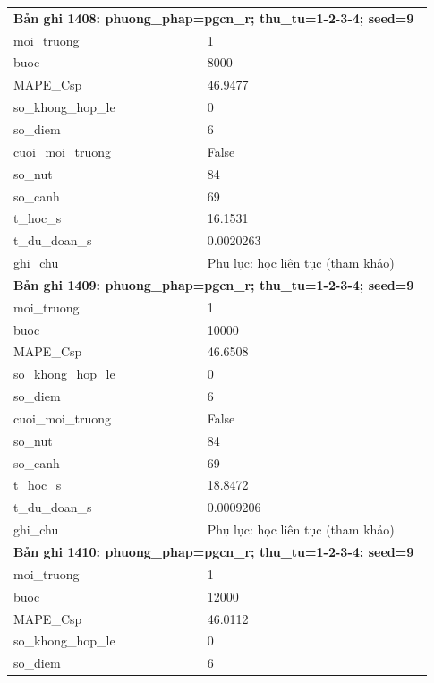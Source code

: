 \begin{longtable}{p{0.43\linewidth}p{0.50\linewidth}}
\midrule
\multicolumn{2}{p{0.95\linewidth}}{\textbf{Bản ghi 1408: phuong\_phap=pgcn\_r; thu\_tu=1-2-3-4; seed=9}} \\
moi\_\allowbreak truong & 1 \\
buoc & 8000 \\
MAPE\_\allowbreak Csp & 46.9477 \\
so\_\allowbreak khong\_\allowbreak hop\_\allowbreak le & 0 \\
so\_\allowbreak diem & 6 \\
cuoi\_\allowbreak moi\_\allowbreak truong & False \\
so\_\allowbreak nut & 84 \\
so\_\allowbreak canh & 69 \\
t\_\allowbreak hoc\_\allowbreak s & 16.1531 \\
t\_\allowbreak du\_\allowbreak doan\_\allowbreak s & 0.0020263 \\
ghi\_\allowbreak chu & Phụ lục: học liên tục (tham khảo) \\
\midrule
\multicolumn{2}{p{0.95\linewidth}}{\textbf{Bản ghi 1409: phuong\_phap=pgcn\_r; thu\_tu=1-2-3-4; seed=9}} \\
moi\_\allowbreak truong & 1 \\
buoc & 10000 \\
MAPE\_\allowbreak Csp & 46.6508 \\
so\_\allowbreak khong\_\allowbreak hop\_\allowbreak le & 0 \\
so\_\allowbreak diem & 6 \\
cuoi\_\allowbreak moi\_\allowbreak truong & False \\
so\_\allowbreak nut & 84 \\
so\_\allowbreak canh & 69 \\
t\_\allowbreak hoc\_\allowbreak s & 18.8472 \\
t\_\allowbreak du\_\allowbreak doan\_\allowbreak s & 0.0009206 \\
ghi\_\allowbreak chu & Phụ lục: học liên tục (tham khảo) \\
\midrule
\multicolumn{2}{p{0.95\linewidth}}{\textbf{Bản ghi 1410: phuong\_phap=pgcn\_r; thu\_tu=1-2-3-4; seed=9}} \\
moi\_\allowbreak truong & 1 \\
buoc & 12000 \\
MAPE\_\allowbreak Csp & 46.0112 \\
so\_\allowbreak khong\_\allowbreak hop\_\allowbreak le & 0 \\
so\_\allowbreak diem & 6 \\

\end{longtable}
